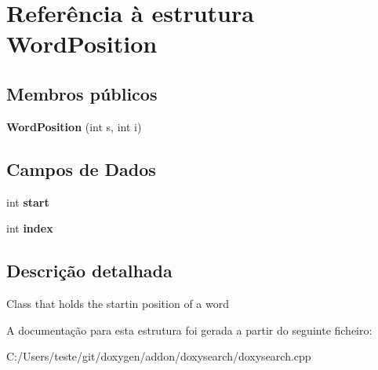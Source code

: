 \hypertarget{struct_word_position}{\section{Referência à estrutura Word\-Position}
\label{struct_word_position}
}
\subsection*{Membros públicos}
\begin{DoxyCompactItemize}
\item 
\hypertarget{struct_word_position_ad7052dfffd3de56512520e8623432c5f}{{\bfseries Word\-Position} (int s, int i)}\label{struct_word_position_ad7052dfffd3de56512520e8623432c5f}

\end{DoxyCompactItemize}
\subsection*{Campos de Dados}
\begin{DoxyCompactItemize}
\item 
\hypertarget{struct_word_position_a37722a150250e2a5a98e5e0d11e53449}{int {\bfseries start}}\label{struct_word_position_a37722a150250e2a5a98e5e0d11e53449}

\item 
\hypertarget{struct_word_position_a750b5d744c39a06bfb13e6eb010e35d0}{int {\bfseries index}}\label{struct_word_position_a750b5d744c39a06bfb13e6eb010e35d0}

\end{DoxyCompactItemize}


\subsection{Descrição detalhada}
Class that holds the startin position of a word 

A documentação para esta estrutura foi gerada a partir do seguinte ficheiro\-:\begin{DoxyCompactItemize}
\item 
C\-:/\-Users/teste/git/doxygen/addon/doxysearch/doxysearch.\-cpp\end{DoxyCompactItemize}
